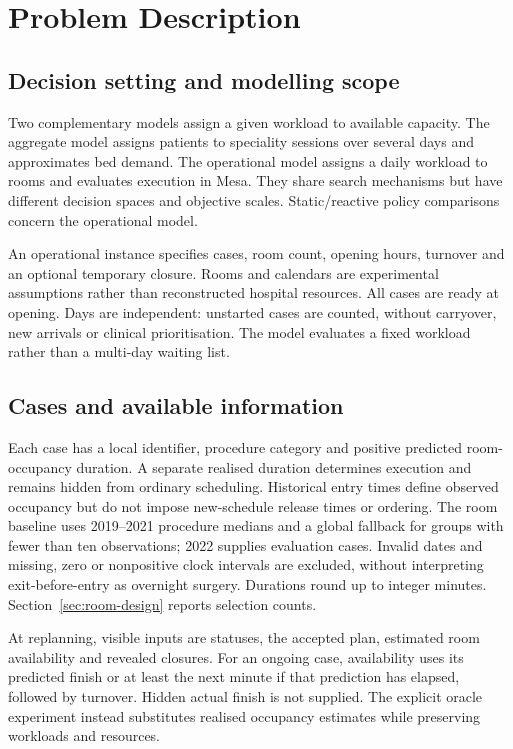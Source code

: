 \section{Problem Description}
\label{sec:problem-description}

\subsection{Decision setting and modelling scope}

Two complementary models assign a given workload to available capacity.
The aggregate model assigns patients to speciality sessions over several days
and approximates bed demand. The operational model assigns a daily workload
to rooms and evaluates execution in Mesa. They share search mechanisms but
have different decision spaces and objective scales. Static/reactive policy
comparisons concern the operational model.

An operational instance specifies cases, room count, opening hours, turnover
and an optional temporary closure. Rooms and calendars are experimental
assumptions rather than reconstructed hospital resources. All cases are ready
at opening. Days are independent: unstarted cases are counted, without
carryover, new arrivals or clinical prioritisation. The model evaluates a
fixed workload rather than a multi-day waiting list.

\subsection{Cases and available information}

Each case has a local identifier, procedure category and positive predicted
room-occupancy duration. A separate realised duration determines execution
and remains hidden from ordinary scheduling. Historical entry times define
observed occupancy but do not impose new-schedule release times or ordering.
The room baseline uses 2019--2021 procedure medians and a global fallback
for groups with fewer than ten observations; 2022 supplies evaluation cases.
Invalid dates and missing, zero or nonpositive clock intervals are excluded,
without interpreting exit-before-entry as overnight surgery. Durations round
up to integer minutes. Section~\ref{sec:room-design} reports selection counts.

At replanning, visible inputs are statuses, the accepted plan, estimated room
availability and revealed closures. For an ongoing case, availability uses
its predicted finish or at least the next minute if that prediction has
elapsed, followed by turnover. Hidden actual finish is not supplied. The
explicit oracle experiment instead substitutes realised occupancy estimates
while preserving workloads and resources.

